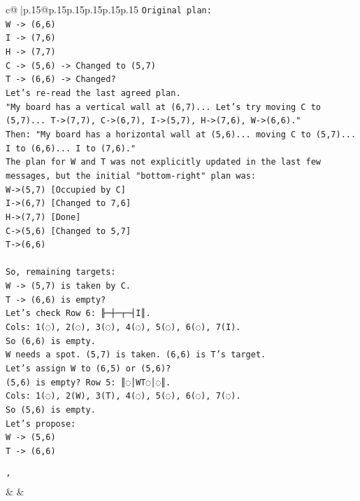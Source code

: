 \documentclass{article}
\begin{document}
{\begin{supertabular}{c@{$\;$}|p{.15\linewidth}@{}p{.15\linewidth}p{.15\linewidth}p{.15\linewidth}p{.15\linewidth}p{.15\linewidth}}
{{{\texttt{Original plan:} \\
\texttt{W {-}> (6,6)} \\
\texttt{I {-}> (7,6)} \\
\texttt{H {-}> (7,7)} \\
\texttt{C {-}> (5,6) {-}> Changed to (5,7)} \\
\texttt{T {-}> (6,6) {-}> Changed?} \\
\texttt{Let's re{-}read the last agreed plan.} \\
\texttt{"My board has a vertical wall at (6,7)... Let's try moving C to (5,7)... T{-}>(7,7), C{-}>(6,7), I{-}>(5,7), H{-}>(7,6), W{-}>(6,6)."} \\
\texttt{Then: "My board has a horizontal wall at (5,6)... moving C to (5,7)... I to (6,6)... I to (7,6)."} \\
\texttt{The plan for W and T was not explicitly updated in the last few messages, but the initial "bottom{-}right" plan was:} \\
\texttt{W{-}>(5,7) {[}Occupied by C{]}} \\
\texttt{I{-}>(6,7) {[}Changed to 7,6{]}} \\
\texttt{H{-}>(7,7) {[}Done{]}} \\
\texttt{C{-}>(5,6) {[}Changed to 5,7{]}} \\
\texttt{T{-}>(6,6)} \\
\\ 
\texttt{So, remaining targets:} \\
\texttt{W {-}> (5,7) is taken by C.} \\
\texttt{T {-}> (6,6) is empty?} \\
\texttt{Let's check Row 6: ╟─┼─┬─┤I║.} \\
\texttt{Cols: 1(◌), 2(◌), 3(◌), 4(◌), 5(◌), 6(◌), 7(I).} \\
\texttt{So (6,6) is empty.} \\
\texttt{W needs a spot. (5,7) is taken. (6,6) is T's target.} \\
\texttt{Let's assign W to (6,5) or (5,6)?} \\
\texttt{(5,6) is empty? Row 5: ║◌│WT◌│◌║.} \\
\texttt{Cols: 1(◌), 2(W), 3(T), 4(◌), 5(◌), 6(◌), 7(◌).} \\
\texttt{So (5,6) is empty.} \\
\texttt{Let's propose:} \\
\texttt{W {-}> (5,6)} \\
\texttt{T {-}> (6,6)} \\
\\ 
\texttt{'} \\
            }
        }
    }
    & & \\ \\


\end{supertabular}}
\end{document}
